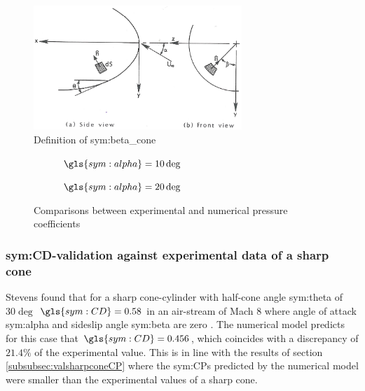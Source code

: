 \begin{figure}[ht]
	\centering
	\includegraphics[width=0.7\textwidth]{./Figure/Aerodynamics/def_beta}
	\caption[Definition of \gls{sym:beta_cone}]{Definition of \gls{sym:beta_cone} \cite{Bertin1994}}
	\label{fig:beta_cone}
\end{figure}

\begin{figure}[ht]
	\centering
	\begin{subfigure}[b]{0.49\textwidth}
		\centering
		\setlength{} 
		\setlength{}
		
		\caption{$\gls{sym:alpha}=10\deg$}
		\label{fig:CPconealpha10}
	\end{subfigure}
		\begin{subfigure}[b]{0.49\textwidth}
			\centering
			\setlength{} 
			\setlength{}
			
		\caption{$\gls{sym:alpha}=20\deg$}
		\label{fig:CPconealpha20}
	\end{subfigure}
	\caption{Comparisons between experimental and numerical pressure coefficients}
	\label{fig:CPcone30val}
\end{figure}

\subsubsection{\gls{sym:CD}-validation against experimental data of a sharp cone}
\label{subsubsec:valsharpconeCD}
Stevens found that for a sharp cone-cylinder with half-cone angle \gls{sym:theta} of $30\deg$ $\gls{sym:CD}=0.58$ in an air-stream of Mach $8$ where angle of attack \gls{sym:alpha} and sideslip angle \gls{sym:beta} are zero \cite{Stevens1950,AndersonJr.2007}. The numerical model predicts for this case that $\gls{sym:CD}=0.456$, which coincides with a discrepancy of $21.4\%$ of the experimental value. This is in line with the results of section \ref{subsubsec:valsharpconeCP} where the \glspl{sym:CP} predicted by the numerical model were smaller than the experimental values of a sharp cone.

